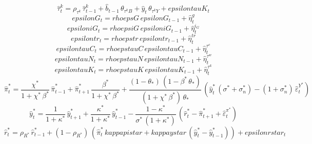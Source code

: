 \begin{dmath}
{\hat{\tau}^k_{t}}={\rho_{\tau^k}}\, {\hat{\tau}^k_{t-1}}+{\hat{b}_{t-1}}\, {\theta_{\tau^kB}}+{\hat{y}_{t}}\, {\theta_{\tau^kY}}+{epsilontauK_{t}}
\end{dmath}
\begin{dmath}
{epsilonG_{t}}={rhoepsG}\, {epsilonG_{t-1}}+{\hat{\eta}^{g}_{t}}
\end{dmath}
\begin{dmath}
{epsiloniG_{t}}={rhoepsiG}\, {epsiloniG_{t-1}}+{\hat{\eta}^{i_G}_{t}}
\end{dmath}
\begin{dmath}
{epsilontr_{t}}={rhoepstr}\, {epsilontr_{t-1}}+{\hat{\eta}^{tr}_{t}}
\end{dmath}
\begin{dmath}
{epsilontauC_{t}}={rhoepstauC}\, {epsilontauC_{t-1}}+{\hat{\eta}^{\tau^c}_{t}}
\end{dmath}
\begin{dmath}
{epsilontauN_{t}}={rhoepstauN}\, {epsilontauN_{t-1}}+{\hat{\eta}^{\tau^w}_{t}}
\end{dmath}
\begin{dmath}
{epsilontauK_{t}}={rhoepstauK}\, {epsilontauK_{t-1}}+{\hat{\eta}^{\tau^k}_{t}}
\end{dmath}
\begin{dmath}
{\hat{\pi}^*_{t}}=\frac{{\chi^*}}{1+{\chi^*}\, {\beta^*}}\, {\hat{\pi}^*_{t-1}}+{\hat{\pi}^*_{t+1}}\, \frac{{\beta^*}}{1+{\chi^*}\, {\beta^*}}+\frac{\left(1-{\theta_*}\right)\, \left(1-{\beta^*}\, {\theta_*}\right)}{\left(1+{\chi^*}\, {\beta^*}\right)\, {\theta_*}}\, \left({\hat{y}^*_{t}}\, \left({\sigma^*}+{\sigma^*_n}\right)-\left(1+{\sigma^*_n}\right)\, {\hat{\varepsilon}^{Y^*}_{t}}\right)
\end{dmath}
\begin{dmath}
{\hat{y}^*_{t}}=\frac{1}{1+{\kappa^*}}\, {\hat{y}^*_{t+1}}+\frac{{\kappa^*}}{1+{\kappa^*}}\, {\hat{y}^*_{t-1}}-\frac{1-{\kappa^*}}{{\sigma^*}\, \left(1+{\kappa^*}\right)}\, \left({\hat{r}^*_{t}}-{\hat{\pi}^*_{t+1}}+{\hat{\varepsilon}^{\pi^*}_{t}}\right)
\end{dmath}
\begin{dmath}
{\hat{r}^*_{t}}={{\rho_{R^*}}}\, {\hat{r}^*_{t-1}}+\left(1-{{\rho_{R^*}}}\right)\, \left({\hat{\pi}^*_{t}}\, {kappapistar}+{kappaystar}\, \left({\hat{y}^*_{t}}-{\hat{y}^*_{t-1}}\right)\right)+{epsilonrstar_{t}}
\end{dmath}
